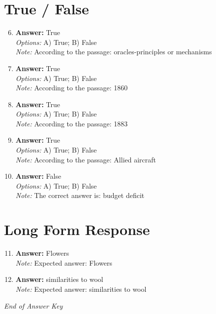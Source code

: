 \documentclass[12pt]{article}
\begin{document}
\section*{True / False}
\begin{enumerate}[label=\arabic*.]
\setcounter{enumi}{5}
\item \textbf{Answer:} True
\\ \textit{Options:} A) True; B) False
\\ \textit{Note:} According to the passage: oracles-principles or mechanisms
\item \textbf{Answer:} True
\\ \textit{Options:} A) True; B) False
\\ \textit{Note:} According to the passage: 1860
\item \textbf{Answer:} True
\\ \textit{Options:} A) True; B) False
\\ \textit{Note:} According to the passage: 1883
\item \textbf{Answer:} True
\\ \textit{Options:} A) True; B) False
\\ \textit{Note:} According to the passage: Allied aircraft
\item \textbf{Answer:} False
\\ \textit{Options:} A) True; B) False
\\ \textit{Note:} The correct answer is: budget deficit
\end{enumerate}

\section*{Long Form Response}
\begin{enumerate}[label=\arabic*.]
\setcounter{enumi}{10}
\item \textbf{Answer:} Flowers
\\ \textit{Note:} Expected answer: Flowers
\item \textbf{Answer:} similarities to wool
\\ \textit{Note:} Expected answer: similarities to wool
\end{enumerate}

\vfill
\noindent\textit{End of Answer Key}
\end{document}
